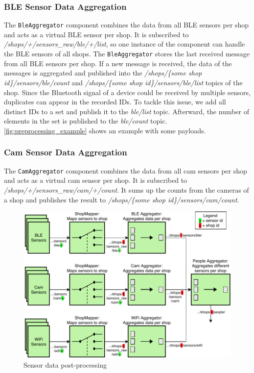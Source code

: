\documentclass[runningheads]{llncs}
\newcommand{\topicname}[1]{\textit{#1}}
\newcommand{\componentname}[1]{\texttt{#1}}
\begin{document}
\subsubsection{BLE Sensor Data Aggregation}
\label{impl:ble-aggr}
The \componentname{Ble\-Aggregator} component combines the data from all BLE sensors per shop and acts as a virtual BLE sensor per shop. It is subscribed to \topicname{/shops/+/sensors\_raw\allowbreak/ble/+/list}, so one instance of the component can handle the BLE sensors of all shops. The \componentname{Ble\-Aggregator} stores the last received message from all BLE sensors per shop. If a new message is received, the data of the messages is aggregated and published into the \topicname{/shops/\{some shop id\}/sensors/ble/count} and \topicname{/shops/\{some shop id\}/sensors/ble/list} topics of the shop. Since the Bluetooth signal of a device could be received by multiple sensors, duplicates can appear in the recorded IDs. To tackle this issue, we add all distinct IDs to a set and publish it to the \topicname{ble/list} topic. Afterward, the number of elements in the set is published to the \topicname{ble/count} topic. \cref{fig:preprocessing_example} shows an example with some payloads.

\subsubsection{Cam Sensor Data Aggregation}
\label{impl:cam-aggr}
The \componentname{CamAggregator} component combines the data from all cam sensors per shop and acts as a virtual cam sensor per shop. It is subscribed to \topicname{/shops/+/sensors\_raw\allowbreak/cam/+/count}. It sums up the counts from the cameras of a shop and publishes the result to \topicname{/shops/\{some shop id\}\allowbreak/sensors/cam/count}. 
\begin{figure}
    \includegraphics[width=.99\linewidth]{assets/sensor/sensor_preprocessing_overview_topics_small.pdf}
    \caption{Sensor data post-processing}
    \label{fig:preprocessing}
\end{figure}
\end{document}
